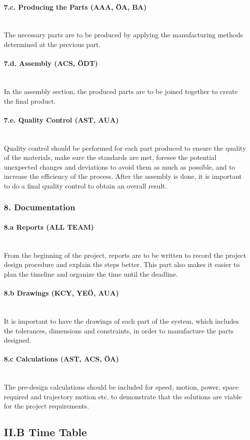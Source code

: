 \documentclass[12pt]{article}
\newcommand{\paragraphs}[1]{\paragraph*{#1}\mbox{}\\}
\begin{document}
\paragraphs{7.c. Producing the Parts (AAA, ÖA, BA)}
The necessary parts are to be produced by applying the manufacturing methods determined at the previous part.   
 
\paragraphs{7.d. Assembly (ACS, ÖDT)}
In the assembly section, the produced parts are to be joined together to create the final product. 

\paragraphs{7.e. Quality Control (AST, AUA)}

Quality control should be performed for each part produced to ensure the quality of the materials, make sure the standards are met, foresee the potential unexpected changes and deviations to avoid them as much as possible, and to increase the efficiency of the process. After the assembly is done, it is important to do a final quality control to obtain an overall result. 

\subsubsection*{8. Documentation}

\paragraphs{8.a Reports (ALL TEAM)}
From the beginning of the project, reports are to be written to record the project design procedure and explain the steps better. This part also makes it easier to plan the timeline and organize the time until the deadline. 

\paragraphs{8.b Drawings (KCY, YEÖ, AUA)}
It is important to have the drawings of each part of the system, which includes the tolerances, dimensions and constraints, in order to manufacture the parts designed. 

\paragraphs{8.c Calculations (AST, ACS, ÖA)}
The pre-design calculations should be included for speed, motion, power, space required and trajectory motion etc. to demonstrate that the solutions are viable for the project requirements. 


\subsection*{II.B Time Table}
\end{document}
